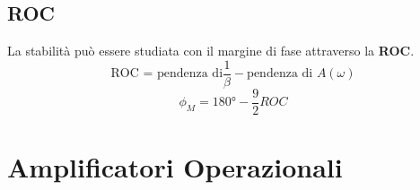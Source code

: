 \documentclass{article}
\begin{document}
\subsection{ROC}
La stabilità può essere studiata con il margine di fase attraverso la \textbf{ROC}.
\begin{equation}
    \mbox {ROC = pendenza di} \frac{1}{\beta} - \mbox{pendenza di }A(\omega) 
\end{equation}
\begin{equation}
    \phi_{M}=180°-\frac{9}{2}ROC
\end{equation}

\newpage
\section{Amplificatori Operazionali}
\end{document}
